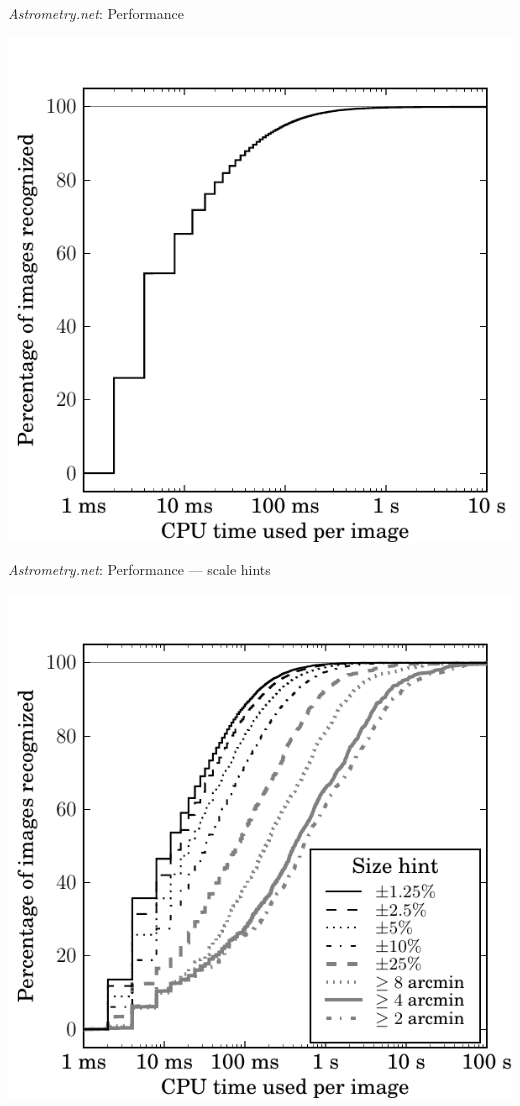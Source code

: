 \documentclass[compress]{beamer}
\newcommand{\an}{\emph{Astrometry.net}\xspace}
\begin{document}
\begin{frame}{\an: Performance}
  \vspace{-10pt}
  \begin{center}
    \includegraphics[height=0.9 \textheight]{sdss-er-cputime}
  \end{center}
\end{frame}

\begin{frame}{\an: Performance --- scale hints}
  \vspace{-10pt}
  \begin{center}
    \includegraphics[height=0.9 \textheight]{sdss-sizehints-time}
  \end{center}
\end{frame}
\end{document}
